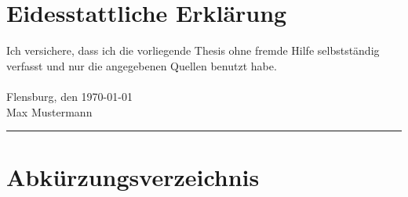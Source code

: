 

\newcommand*{\mytitle}{\LaTeX-Vorlage für Berichte, Bachelor- oder Masterarbeiten} %
\newcommand*{\myinstitute}{Hochschue Flensburg} %
\newcommand*{\myfaculty}{Fachbereich 1: \textit{Musterstudiengang}} %
\newcommand*{\myauthor}{Max Mustermann} %
\newcommand*{\myreporttype}{Abschlussarbeit} %
\newcommand*{\mygraduation}{Master of Engineering} %
\newcommand*{\firstexaminer}{Prof. Dr.-Ing. Max Mustermann} %
\newcommand*{\secondexaminer}{Prof. Dr.-Ing. Maxima Musterfrau} %
\newcommand*{\mydate}{\today} %




	
\pagestyle{empty}

\newpage 					%
\thispagestyle{empty}
\quad 
\newpage
{}
 
\cleardoubleoddpage


\chapter*{Eidesstattliche Erklärung}
Ich versichere, dass ich die vorliegende Thesis ohne fremde Hilfe selbstständig verfasst und nur die angegebenen Quellen benutzt habe.
\\~\\
Flensburg, den \today\\[.6cm]
\myauthor\\
\rule[0.5em]{20em}{0.5pt}



\tableofcontents			%
\listoffigures				%
\listoftables				%
\chapter*{Abkürzungsverzeichnis}
	\begin{acronym}[4GDH]	%
	\end{acronym}

\pagestyle{fancy}







\newpage
\lhead{}
\rhead{\leftmark}


\appendix



